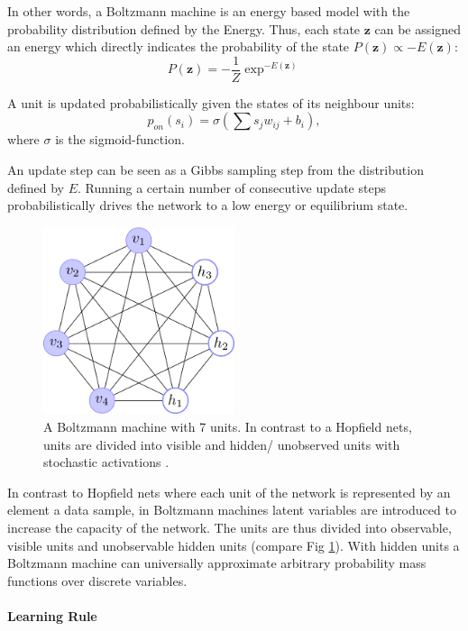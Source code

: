 In other words, a Boltzmann machine is an energy based model with the probability distribution defined by the Energy.
Thus, each state $\textbf{z}$ can be assigned an energy which directly indicates the probability of the state $P(\textbf{z}) \propto -E(\textbf{z})$:
\[
P(\textbf{z}) = - \frac{1}{Z} \exp^{-E(\textbf{z})} 
\]

A unit is updated probabilistically given the states of its neighbour units:
\[
p_{on}(s_i) = \sigma( \sum s_j w_{ij} + b_i ), 
\]
where $\sigma$ is the sigmoid-function.

An update step can be seen as a Gibbs sampling step from the distribution defined by $E$.
Running a certain number of consecutive update steps probabilistically drives the network to a low energy or equilibrium state.


\begin{figure}
	\centering
    	\includegraphics[width=0.5\textwidth]{imgs/bm.png} 
    \caption[A Boltzmann machine with 7 units.]{A Boltzmann machine with 7 units. In contrast to a Hopfield nets, units are divided into visible and hidden/ unobserved units with stochastic activations \cite{boltzImg}.}
	\label{fig:bm}
\end{figure}

In contrast to Hopfield nets where each unit of the network is represented by an element a data sample, in Boltzmann machines latent variables are introduced to increase the capacity of the network.
The units are thus divided into observable, visible units and unobservable hidden units (compare Fig \ref{fig:bm}).
With hidden units a Boltzmann machine can universally approximate arbitrary probability mass functions over discrete variables.


\paragraph{Learning Rule} \label{c:cd}

